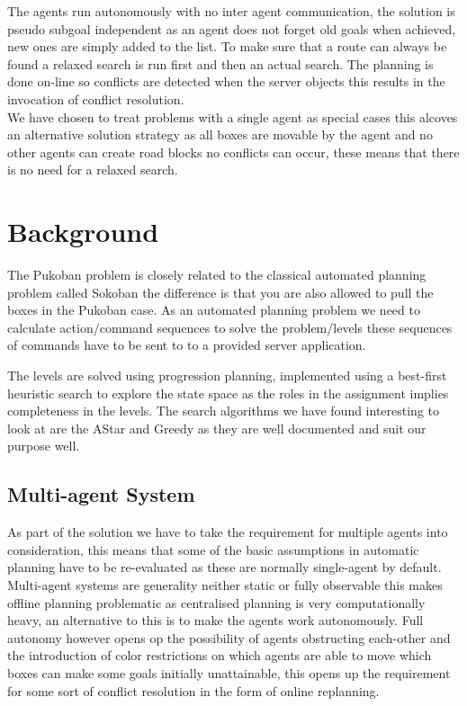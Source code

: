 \documentclass[letterpaper]{article}
\begin{document}
		The agents run autonomously with no inter agent communication, the solution is pseudo subgoal independent as an agent does not forget old goals when achieved, new ones are simply added to the list. To make sure that a route can always be found a relaxed search is run first and then an actual search. The planning is done on-line so conflicts are detected when the server objects this results in the invocation of conflict resolution.\\
		We have chosen to treat problems with a single agent as special cases this alcoves an alternative solution strategy as all boxes are movable by the agent and no other agents can create road blocks no conflicts can occur, these means that there is no need for a relaxed search.

\section{Background}
	The Pukoban problem is closely related to the classical automated planning problem called Sokoban the difference is that you are also allowed to pull the boxes in the Pukoban case. As an automated planning problem we need to calculate action/command sequences to solve the problem/levels these sequences of commands have to be sent to to a provided server application.
	
	The levels are solved using progression planning, implemented using a best-first heuristic search to explore the state space as the roles in the assignment implies completeness in the levels. The search algorithms we have found interesting to look at are the AStar and Greedy as they are well documented and suit our purpose well.
	\subsection{Multi-agent System}
		As part of the solution we have to take the requirement for multiple agents into consideration, this means that some of the basic assumptions in automatic planning have to be re-evaluated as these are normally single-agent by default.
		Multi-agent systems are generality neither static or fully observable this makes offline planning problematic as centralised planning is very computationally heavy, an alternative to this is to make the agents work autonomously. Full autonomy  however opens op the possibility of agents obstructing each-other and the introduction of color restrictions on which agents are able to move which boxes can make some goals initially unattainable, this opens up the requirement for some sort of conflict resolution in the form of online replanning.
\end{document}
